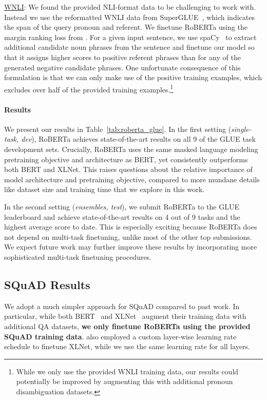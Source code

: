 \documentclass[11pt]{article}
\newcommand{\ourmodel}{RoBERTa}
\newcommand{\bertlarge}{BERT}
\newcommand{\xlnetlarge}{XLNet}
\begin{document}
\underline{WNLI}: We found the provided NLI-format data to be challenging to work with.
Instead we use the reformatted WNLI data from SuperGLUE~\cite{wang2019superglue}, which indicates the span of the query pronoun and referent.
We finetune \ourmodel{} using the margin ranking loss from .
For a given input sentence, we use spaCy~\cite{spacy2} to extract additional candidate noun phrases from the sentence and finetune our model so that it assigns higher scores to positive referent phrases than for any of the generated negative candidate phrases.
One unfortunate consequence of this formulation is that we can only make use of the positive training examples, which excludes over half of the provided training examples.\footnote{While we only use the provided WNLI training data, our results could potentially be improved by augmenting this with additional pronoun disambiguation datasets.}

\paragraph{Results}

We present our results in Table~\ref{tab:roberta_glue}.
In the first setting (\emph{single-task, dev}), \ourmodel{} achieves state-of-the-art results on all 9 of the GLUE task development sets.
Crucially, \ourmodel{} uses the same masked language modeling pretraining objective and architecture as \bertlarge{}, yet consistently outperforms both \bertlarge{} and \xlnetlarge{}.
This raises questions about the relative importance of model architecture and pretraining objective, compared to more mundane details like dataset size and training time that we explore in this work.

In the second setting (\emph{ensembles, test}), we submit \ourmodel{} to the GLUE leaderboard and achieve state-of-the-art results on 4 out of 9 tasks and the highest average score to date.
This is especially exciting because \ourmodel{} does not depend on multi-task finetuning, unlike most of the other top submissions.
We expect future work may further improve these results by incorporating more sophisticated multi-task finetuning procedures.

\subsection{SQuAD Results} \label{sec:results_squad}

We adopt a much simpler approach for SQuAD compared to past work.
In particular, while both BERT~\cite{devlin2018bert} and XLNet~\cite{yang2019xlnet} augment their training data with additional QA datasets, \textbf{we only finetune \ourmodel{} using the provided SQuAD training data}.
 also employed a custom layer-wise learning rate schedule to finetune XLNet, while we use the same learning rate for all layers.
\end{document}
